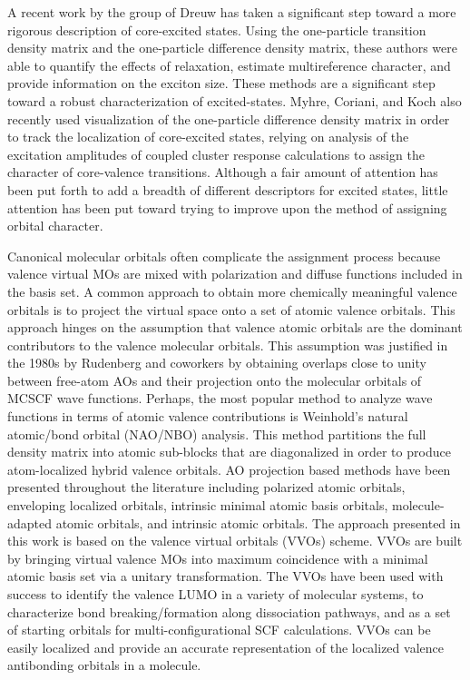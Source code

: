 \documentclass{article}
\begin{document}
A recent work by the group of Dreuw\cite{wenzel_physical_2016,plasser_new_2014,plasser_new_2014-1} has taken a significant step toward a more rigorous description of core-excited states.
Using the one-particle transition density matrix and the one-particle difference density matrix, these authors were able to quantify the effects of relaxation, estimate multireference character, and provide information on the exciton size. These methods are a significant step toward a robust characterization of excited-states.
Myhre, Coriani, and Koch\cite{myhre_near-edge_2016} also recently used visualization of the one-particle difference density matrix in order to track the localization of core-excited states, relying on analysis of the excitation amplitudes of coupled cluster response calculations to assign the character of core-valence transitions. Although a fair amount of attention has been put forth to add a breadth of different descriptors for excited states, little attention has been put toward trying to improve upon the method of assigning orbital character.

Canonical molecular orbitals often complicate the assignment process because valence virtual MOs are mixed with polarization and diffuse functions included in the basis set.
A common approach to obtain more chemically meaningful valence orbitals is to project the virtual space onto a set of atomic valence orbitals. This approach hinges on the assumption that valence atomic orbitals are the dominant contributors to the valence molecular orbitals. This assumption was justified in the 1980s by Rudenberg and coworkers by obtaining overlaps close to unity between free-atom AOs and their projection onto the molecular orbitals of MCSCF wave functions. \cite{ruedenberg_are_1982}
Perhaps, the most popular method to analyze wave functions in terms of atomic valence contributions is Weinhold's natural atomic/bond orbital (NAO/NBO) analysis.\cite{foster_natural_1980,reed_natural_1985} This method partitions the full density matrix into atomic sub-blocks that are diagonalized in order to produce atom-localized hybrid valence orbitals.
AO projection based methods have been presented throughout the literature including polarized atomic orbitals, \cite{lee_extracting_2000-1,subotnik_fast_2005} enveloping localized orbitals,\cite{auer_dynamically_2006-1} intrinsic minimal atomic basis orbitals,\cite{laikov_intrinsic_2011-1} molecule-adapted atomic orbitals, \cite{szczepanik_minimal_2013-1} and intrinsic atomic orbitals. \cite{knizia_intrinsic_2013}
The approach presented in this work is based on the valence virtual orbitals (VVOs) scheme. \cite{lu_molecule_2004}
VVOs are built by bringing virtual valence MOs into maximum coincidence with a minimal atomic basis set via a unitary transformation.
The VVOs have been used with success to identify the valence LUMO in a variety of molecular systems,\cite{schmidt_valence_2015} to characterize bond breaking/formation along dissociation pathways,\cite{west_comprehensive_2015-1} and as a set of starting orbitals for multi-configurational SCF calculations.\cite{west_comprehensive_2013} VVOs can be easily localized and provide an accurate representation of the localized valence antibonding orbitals in a molecule. 
\end{document}

